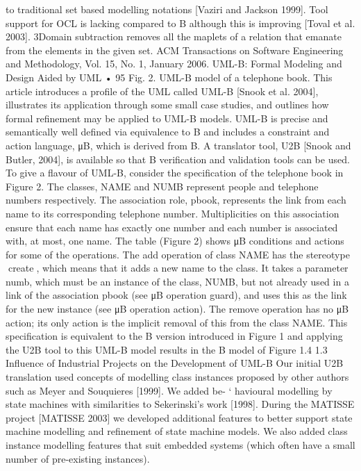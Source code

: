 to traditional set based modelling notations [Vaziri and Jackson 1999]. Tool
support for OCL is lacking compared to B although this is improving [Toval
et al. 2003].
3Domain subtraction removes all the maplets of a relation that emanate from the elements in the
given set.
ACM Transactions on Software Engineering and Methodology, Vol. 15, No. 1, January 2006.
UML-B: Formal Modeling and Design Aided by UML • 95
Fig. 2. UML-B model of a telephone book.
This article introduces a profile of the UML called UML-B [Snook et al. 2004],
illustrates its application through some small case studies, and outlines how
formal refinement may be applied to UML-B models. UML-B is precise and
semantically well defined via equivalence to B and includes a constraint and
action language, μB, which is derived from B. A translator tool, U2B [Snook
and Butler, 2004], is available so that B verification and validation tools can
be used. To give a flavour of UML-B, consider the specification of the telephone
book in Figure 2. The classes, NAME and NUMB represent people and telephone
numbers respectively. The association role, pbook, represents the link from each
name to its corresponding telephone number. Multiplicities on this association
ensure that each name has exactly one number and each number is associated
with, at most, one name. The table (Figure 2) shows μB conditions and actions
for some of the operations. The add operation of class NAME has the stereotype
create, which means that it adds a new name to the class. It takes a parameter numb, which must be an instance of the class, NUMB, but not already used
in a link of the association pbook (see μB operation guard), and uses this as the
link for the new instance (see μB operation action). The remove operation has
no μB action; its only action is the implicit removal of this from the class NAME.
This specification is equivalent to the B version introduced in Figure 1 and
applying the U2B tool to this UML-B model results in the B model of Figure 1.4
1.3 Influence of Industrial Projects on the Development of UML-B
Our initial U2B translation used concepts of modelling class instances proposed by other authors such as Meyer and Souquieres [1999]. We added be- `
havioural modelling by state machines with similarities to Sekerinski’s work
[1998]. During the MATISSE project [MATISSE 2003] we developed additional
features to better support state machine modelling and refinement of state
machine models. We also added class instance modelling features that suit embedded systems (which often have a small number of pre-existing instances).

